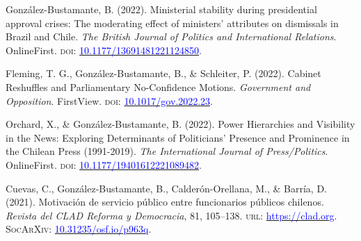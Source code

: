 \begin{publications}

\begin{benumerate}{9}

\item{González-Bustamante, B. (2022). Ministerial stability during presidential approval crises: The moderating effect of ministers’ attributes on dismissals in Brazil and Chile. {\itshape The British Journal of Politics and International Relations}. OnlineFirst. {\scshape doi:} \href{https://doi.org/10.1177/13691481221124850}{\textcolor{blue}{10.1177/13691481221124850}}.}\vspace{1mm}

\item{Fleming, T. G., González-Bustamante, B., \& Schleiter, P. (2022). Cabinet Reshuffles and Parliamentary No-Confidence Motions. {\itshape Government and Opposition}. FirstView. {\scshape doi:} \href{https://doi.org/10.1017/gov.2022.23}{\textcolor{blue}{10.1017/gov.2022.23}}.}\vspace{1mm}

\item{Orchard, X., \& González-Bustamante, B. (2022). Power Hierarchies and Visibility in the News: Exploring Determinants of Politicians’ Presence and Prominence in the Chilean Press (1991-2019). {\itshape The International Journal of Press/Politics}. OnlineFirst. {\scshape doi:} \href{https://doi.org/10.1177/19401612221089482}{\textcolor{blue}{10.1177/19401612221089482}}.}\vspace{1mm}


\item{Cuevas, C., González-Bustamante, B., Calderón-Orellana, M., \& Barría, D. (2021). Motivación de servicio público entre funcionarios públicos chilenos. {\itshape Revista del CLAD Reforma y Democracia}, 81, 105--138. {\scshape url:} \href{https://clad.org/documentacion/revista-clad/articulos-publicados/081-noviembre-2021/}{\textcolor{blue}{https://clad.org}}. {\scshape \footnotesize SocArXiv:} \href{https://doi.org/10.31235/osf.io/p963q}{\textcolor{blue}{10.31235/osf.io/p963q}}.}\vspace{1mm}


\end{benumerate}
\end{publications}
